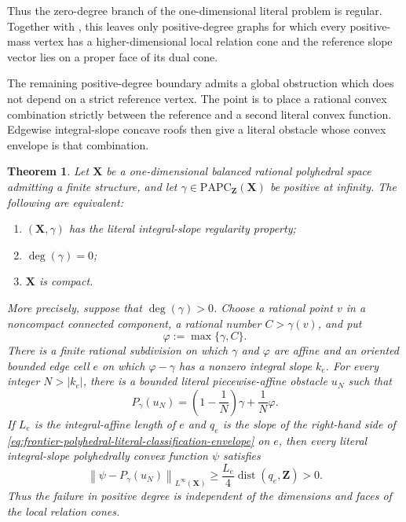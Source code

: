 \documentclass[11pt,a4paper]{article}
\newtheorem{theorem}{Theorem}[section]
\theoremstyle{definition}
\theoremstyle{remark}
\begin{document}
Thus the zero-degree branch of the one-dimensional literal problem is
regular.  Together with
, this
leaves only positive-degree graphs for which every positive-mass vertex has
a higher-dimensional local relation cone and the reference slope vector lies
on a proper face of its dual cone.






The remaining positive-degree boundary admits a global obstruction which
does not depend on a strict reference vertex.  The point is to place a
rational convex combination strictly between the reference and a second
literal convex function.  Edgewise integral-slope concave roofs then give a
literal obstacle whose convex envelope is that combination.



\begin{theorem}
\label{thm:frontier-polyhedral-one-dimensional-literal-classification}
Let $\mathbf X$ be a one-dimensional balanced rational polyhedral space
admitting a finite structure, and let
$\gamma\in\mathrm{PAPC}_{\mathbf Z}(\mathbf X)$ be positive at infinity.
The following are equivalent:
\begin{enumerate}
\item $(\mathbf X,\gamma)$ has the literal integral-slope regularity
property;
\item $\deg(\gamma)=0$;
\item $\mathbf X$ is compact.
\end{enumerate}

More precisely, suppose that $\deg(\gamma)>0$.  Choose a rational point $v$
in a noncompact connected component, a rational number $C>\gamma(v)$, and
put
\[
                 \varphi:=\max\{\gamma,C\}.
\]
There is a finite rational subdivision on which $\gamma$ and $\varphi$ are
affine and an oriented bounded edge cell $e$ on which
$\varphi-\gamma$ has a nonzero integral slope $k_e$.  For every integer
$N>|k_e|$, there is a bounded literal piecewise-affine obstacle $u_N$ such
that
\begin{equation}
 P_\gamma(u_N)
 =\left(1-\frac1N\right)\gamma+\frac1N\varphi.
 \label{eq:frontier-polyhedral-literal-classification-envelope}
\end{equation}
If $L_e$ is the integral-affine length of $e$ and $q_e$ is the slope of the
right-hand side of
\eqref{eq:frontier-polyhedral-literal-classification-envelope} on $e$, then
every literal integral-slope polyhedrally convex function $\psi$ satisfies
\begin{equation}
 \left\lVert\psi-P_\gamma(u_N)\right\rVert_{L^\infty(\mathbf X)}
 \geq \frac{L_e}{4}\operatorname{dist}(q_e,\mathbf Z)>0.
 \label{eq:frontier-polyhedral-literal-classification-separation}
\end{equation}
Thus the failure in positive degree is independent of the dimensions and
faces of the local relation cones.
\end{theorem}
\end{document}
